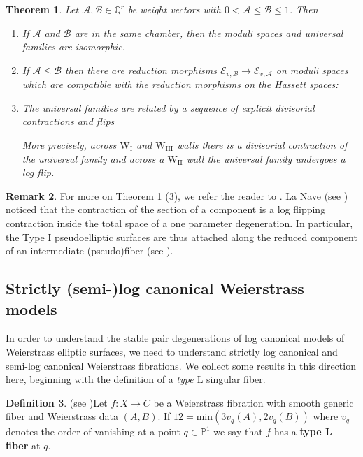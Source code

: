 \documentclass[11pt]{amsart}
\newtheorem{theorem}{Theorem}[section]
\theoremstyle{definition}
\newtheorem{definition}[theorem]{Definition}
\newtheorem{remark}[theorem]{Remark}
\theoremstyle{remark}
\newcommand{\bP}{{\mathbb P}}
\newcommand{\bQ}{{\mathbb Q}}
\newcommand{\calA}{\mathcal A}
\newcommand{\calB}{\mathcal B}
\newcommand{\calE}{\mathcal E}
\newcommand{\wi}{\mathrm{W}_{\mathrm{I}}}
\newcommand{\wii}{\mathrm{W}_{\mathrm{II}}}
\newcommand{\wiii}{\mathrm{W}_{\mathrm{III}}}
\begin{document}
	
	
	\begin{theorem}\cite[Theorem 1.5]{master}\label{thm:main} Let $\calA, \calB \in \bQ^r$ be weight vectors with $0 < \calA \leq \calB \leq 1$. Then
		\begin{enumerate}
			\item If $\calA$ and $\calB$ are in the same chamber, then the moduli spaces and universal families are isomorphic.
			\item If $\calA \le \calB$ then there are reduction morphisms $\calE_{v,\calB} \to \calE_{v,\calA}$ on moduli spaces which are compatible with the reduction morphisms on the Hassett spaces:
			
			\item The universal families are related by a sequence of explicit divisorial contractions and flips 
			
			\noindent More precisely, across $\wi$ and $\wiii$ walls there is a divisorial contraction of the universal family and across a $\wii$ wall the universal family undergoes a log flip. 
	\end{enumerate}\end{theorem}
	
	\begin{remark}\label{rmk:flipping} For more on Theorem \ref{thm:main} (3), we refer the reader to \cite[Section 8]{master}. La Nave (see \cite[Section 4.3, Theorem 7.1.2]{ln}) noticed that the contraction of the section of a component is a log flipping contraction inside the total space of a one parameter degeneration.  In particular, the Type I pseudoelliptic surfaces are thus attached along the reduced component of an intermediate (pseudo)fiber (see \cite[Figure 13]{master}). \end{remark}
	
	\subsection{Strictly (semi-)log canonical Weierstrass models} 
	
	In order to understand the stable pair degenerations of log canonical models of Weierstrass elliptic surfaces, we need to understand strictly log canonical and semi-log canonical Weierstrass fibrations. We collect some results in this direction here, beginning with the definition of a \emph{type $\mathrm{L}$} singular fiber. 
	
	\begin{definition}(see \cite[Section 3.3]{ln})\label{def:l} Let $f: X \to C$ be a Weierstrass fibration with smooth generic fiber and Weierstrass data $(A,B)$. If $12 = \textrm{min}(3v_q(A), 2v_q(B))$ where $v_q$ denotes the order of vanishing at a point $q \in \bP^1$ we say that $f$ has a \textbf{type L fiber} at $q$. \end{definition} 
	
\end{document}
